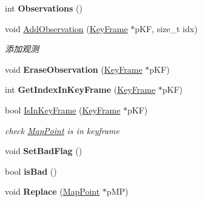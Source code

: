 \begin{DoxyCompactItemize}
\item 
\hypertarget{classORB__SLAM2_1_1MapPoint_a7fbc2a95f49eb6facdc5d5fa35de3287}{int {\bfseries Observations} ()}\label{classORB__SLAM2_1_1MapPoint_a7fbc2a95f49eb6facdc5d5fa35de3287}

\item 
void \hyperlink{classORB__SLAM2_1_1MapPoint_a37277ee3c7d8657976e749ab920bb13f}{Add\-Observation} (\hyperlink{classORB__SLAM2_1_1KeyFrame}{Key\-Frame} $\ast$p\-K\-F, size\-\_\-t idx)
\begin{DoxyCompactList}\small\item\em 添加观测 \end{DoxyCompactList}\item 
\hypertarget{classORB__SLAM2_1_1MapPoint_a79e6a93ea0c39329a082f4f69560f1be}{void {\bfseries Erase\-Observation} (\hyperlink{classORB__SLAM2_1_1KeyFrame}{Key\-Frame} $\ast$p\-K\-F)}\label{classORB__SLAM2_1_1MapPoint_a79e6a93ea0c39329a082f4f69560f1be}

\item 
\hypertarget{classORB__SLAM2_1_1MapPoint_afbe3f2cf7f4d5e4596fa9f7ff0d44470}{int {\bfseries Get\-Index\-In\-Key\-Frame} (\hyperlink{classORB__SLAM2_1_1KeyFrame}{Key\-Frame} $\ast$p\-K\-F)}\label{classORB__SLAM2_1_1MapPoint_afbe3f2cf7f4d5e4596fa9f7ff0d44470}

\item 
bool \hyperlink{classORB__SLAM2_1_1MapPoint_a7a8c48a885598ba4da3b188791dfd009}{Is\-In\-Key\-Frame} (\hyperlink{classORB__SLAM2_1_1KeyFrame}{Key\-Frame} $\ast$p\-K\-F)
\begin{DoxyCompactList}\small\item\em check \hyperlink{classORB__SLAM2_1_1MapPoint}{Map\-Point} is in keyframe \end{DoxyCompactList}\item 
\hypertarget{classORB__SLAM2_1_1MapPoint_a7ed2a66b528165d6c39cb6f84f684308}{void {\bfseries Set\-Bad\-Flag} ()}\label{classORB__SLAM2_1_1MapPoint_a7ed2a66b528165d6c39cb6f84f684308}

\item 
\hypertarget{classORB__SLAM2_1_1MapPoint_a46bb6b57cd914c9ebad30007f3af469a}{bool {\bfseries is\-Bad} ()}\label{classORB__SLAM2_1_1MapPoint_a46bb6b57cd914c9ebad30007f3af469a}

\item 
\hypertarget{classORB__SLAM2_1_1MapPoint_a8f2e205afcfae3dc70196bcd29194440}{void {\bfseries Replace} (\hyperlink{classORB__SLAM2_1_1MapPoint}{Map\-Point} $\ast$p\-M\-P)}\label{classORB__SLAM2_1_1MapPoint_a8f2e205afcfae3dc70196bcd29194440}


\end{DoxyCompactItemize}
